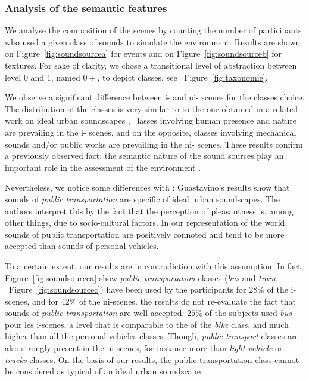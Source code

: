 \documentclass[twoside,twocolumn]{article}
\begin{document}
\subsubsection*{Analysis of the semantic features}

We analyse the composition of the scenes by counting the number of participants who used a given class of sounds to simulate the environment. Results are shown on Figure~\ref{fig:soundsourcea} for events and on Figure~\ref{fig:soundsourceb} for textures. For sake of clarity, we chose a transitional level of abstraction between level 0 and 1, named $0+$, to depict classes, see ~Figure~\ref{fig:taxonomie}.

We observe a significant difference between i- and ni- scenes for the classes choice. The distribution of the classes is very similar to to the one obtained in a related work on ideal urban soundscapes \cite{guastavino2006ideal}, \ie~lasses involving human presence and nature are prevailing in the i- scenes, and on the opposite, classes involving mechanical sounds and/or public works are prevailing in the ni- scenes. These results confirm a previously observed fact: the semantic nature of the sound sources play an important role in the assessment of the environment \cite{raimbault2005urban,dubois2006cognitive}.

Nevertheless, we notice some differences with \cite{guastavino2006ideal}: Guastavino’s results show that sounds of \emph{public transportation} are specific of ideal urban soundscapes. The authors interpret this by the fact that the perception of pleasantness is, among other things, due to socio-cultural factors. In our representation of the world, sounds of public transportation are positively connoted and tend to be more accepted than sounds of personal vehicles.

To a certain extent, our results are in contradiction with this assumption. In fact,  Figure~\ref{fig:soundsourcea} show \emph{public transportation} classes (\emph{bus} and \emph{train}, \cf~Figure~\ref{fig:soundsourcec}) have been used by the participants for $28\%$ of the i-scenes, and for $42\%$ of the ni-scenes. the results do not re-evaluate the fact that sounds of \emph{public transportation} are well accepted: $25\%$ of the subjects used \emph{bus} pour les i-scenes, a level that is comparable to the of the \emph{bike} class, and much higher than all the personal vehicles classes. Though, \emph{public transport} classes are also strongly present in the ni-scenes, for instance more than \emph{light vehicle} or \emph{trucks} classes. On the basis of our results, the public transportation class cannot be considered as typical of an ideal urban soundscape.
\end{document}
